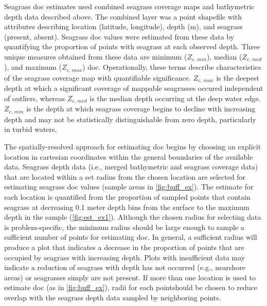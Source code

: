\documentclass[letterpaper,12pt,oneside]{article}\usepackage[]{graphicx}\usepackage[]{color}
\begin{document}
Seagrass \acl{doc} estimates used combined seagrass coverage maps and bathymetric depth data described above.  The combined layer was a point shapefile with attributes describing location (latitude, longitude), depth (m), and seagrass (present, absent).  Seagrass \ac{doc} values were estimated from these data by quantifying the proportion of points with seagrass at each observed depth.  Three unique measures obtained from these data are minimum ($Z_{c,\,min}$), median ($Z_{c,\,med}$), and maximum ($Z_{c,\,max}$) \acl{doc}.  Operationally, these terms describe characteristics of the seagrass coverage map with quantifiable significance. $Z_{c,\,max}$ is the deepest depth at which a significant coverage of mappable seagrasses occured independent of outliers, whereas  $Z_{c,\,med}$ is the median depth occurring at the deep water edge. $Z_{c,\,min}$ is the depth at which seagrass coverage begins to decline with increasing depth and may not be statistically distinguishable from zero depth, particularly in turbid waters.

The spatially-resolved approach for estimating \ac{doc} begins by choosing an explicit location in cartesian coordinates within the general boundaries of the available data.  Seagrass depth data (i.e., merged bathymetric and seagrass coverage data) that are located within a set radius from the chosen location are selected for estimating seagrass \ac{doc} values (sample areas in \cref{fig:buff_ex}). The estimate for each location is quantified from the proportion of sampled points that contain seagrass at decreasing 0.1 meter depth bins from the surface to the maximum depth in the sample (\cref{fig:est_ex1}).  Although the chosen radius for selecting data is problem-specific, the minimum radius should be large enough to sample a sufficient number of points for estimating \ac{doc}.  In general, a sufficient radius will produce a plot that indicates a decrease in the proportion of points that are occupied by seagrass with increasing depth. Plots with insufficient data may indicate a reduction of seagrass with depth has not occurred (e.g.,  nearshore areas) or seagrasses simply are not present.  If more than one location is used to estimate \ac{doc} (as in \cref{fig:buff_ex}), radii for each pointshould be chosen to reduce overlap with the seagrass depth data sampled by neighboring points.     
\end{document}
